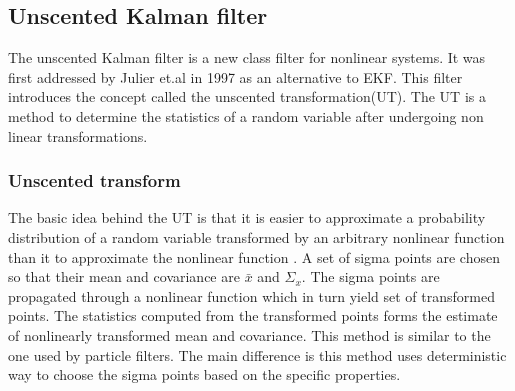 \subsection{Unscented Kalman filter}
The unscented Kalman filter is a new class filter for nonlinear systems. It was first addressed by Julier et.al in 1997 \citep{jul97} as an alternative to EKF. This filter introduces the concept called the unscented transformation(UT). The UT is a method to determine the statistics of a random variable after undergoing non linear transformations.

\subsubsection{Unscented transform}
The basic idea behind the UT is that it is easier to approximate a probability distribution of a random variable transformed by an arbitrary nonlinear function than it to approximate the nonlinear function \citep{jul04}. A set of sigma points are chosen so that their mean and covariance are $\bar x$ and $\Sigma_x$. The sigma points are propagated through a nonlinear function which in turn yield set of transformed points. The statistics computed from the transformed points forms the estimate of nonlinearly transformed mean and covariance. This method is similar to the one used by particle filters. The main difference is this method uses deterministic way to choose the sigma points based on the specific properties.

